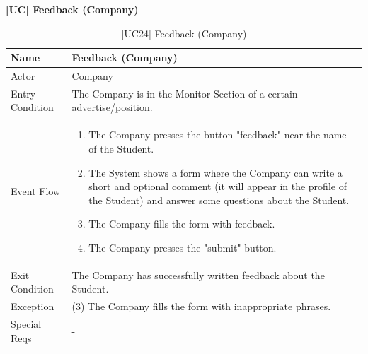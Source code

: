 \textbf{[UC\nextUseCases] Feedback (Company)}
\begin{table}[H] %
    \centering
    \begin{tabular}{|p{3cm}|p{10cm}|}
    \hline
    Name & Feedback (Company) \\ \hline
    Actor  & Company \\ \hline
    Entry Condition  & The Company is in the Monitor Section of a certain advertise/position. \\ \hline
    Event Flow  & 
    \begin{enumerate}[noitemsep, topsep=0pt]
        \item The Company presses the button "feedback" near the name of the Student.
        \item The System shows a form where the Company can write a short and optional comment (it will appear in the profile of the Student) and answer some questions about the Student.
        \item The Company fills the form with feedback.
        \item The Company presses the "submit" button.
    \end{enumerate}
    \\ \hline
    Exit Condition  & The Company has successfully written feedback about the Student. \\ \hline
    Exception  & (3) The Company fills the form with inappropriate phrases. \\ \hline
    Special Reqs  & - \\ \hline
    \end{tabular}
    \caption{[UC24] Feedback (Company)}
\end{table}


